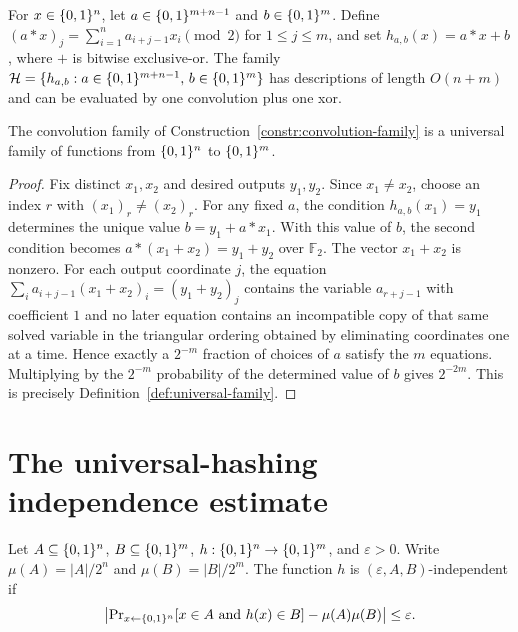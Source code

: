 \begin{construction}
  \label{constr:convolution-family}
  For $x \in \{0,1\}^n$, let $a \in \{0,1\}^{m+n-1}$ and $b \in \{0,1\}^m$. Define
  $(a*x)_j=\sum_{i=1}^{n} a_{i+j-1}x_i \pmod 2$ for $1 \le j \le m$, and set
  $h_{a,b}(x)=a*x+b$, where $+$ is bitwise exclusive-or. The family
  $\mathcal{H}=\{h_{a,b}:a \in \{0,1\}^{m+n-1},\, b \in \{0,1\}^m\}$ has descriptions of
  length $O(n+m)$ and can be evaluated by one convolution plus one xor.
\end{construction}

\begin{lemma}
  \label{lem:convolution-universal}
  The convolution family of Construction~\ref{constr:convolution-family} is a
  universal family of functions from $\{0,1\}^n$ to $\{0,1\}^m$.
\end{lemma}
\begin{proof}
  Fix distinct $x_1,x_2$ and desired outputs $y_1,y_2$. Since $x_1 \ne x_2$,
  choose an index $r$ with $(x_1)_r \ne (x_2)_r$. For any fixed $a$, the
  condition $h_{a,b}(x_1)=y_1$ determines the unique value $b=y_1+a*x_1$.
  With this value of $b$, the second condition becomes
  $a*(x_1+x_2)=y_1+y_2$ over $\mathbb F_2$. The vector $x_1+x_2$ is nonzero.
  For each output coordinate $j$, the equation
  $\sum_i a_{i+j-1}(x_1+x_2)_i=(y_1+y_2)_j$ contains the variable
  $a_{r+j-1}$ with coefficient $1$ and no later equation contains an
  incompatible copy of that same solved variable in the triangular ordering
  obtained by eliminating coordinates one at a time. Hence exactly a
  $2^{-m}$ fraction of choices of $a$ satisfy the $m$ equations. Multiplying
  by the $2^{-m}$ probability of the determined value of $b$ gives
  $2^{-2m}$. This is precisely Definition~\ref{def:universal-family}.
\end{proof}

\chapter{The universal-hashing independence estimate}

\begin{definition}
  \label{def:hash-independence}
  Let $A \subseteq \{0,1\}^n$, $B \subseteq \{0,1\}^m$, $h:\{0,1\}^n \to \{0,1\}^m$,
  and $\varepsilon>0$. Write $\mu(A)=|A|/2^n$ and $\mu(B)=|B|/2^m$.
  The function $h$ is $(\varepsilon,A,B)$-independent if
  \[
    \left|\operatorname{Pr}_{x \leftarrow \{0,1\}^n}[x \in A \text{ and } h(x)\in B]
      -\mu(A)\mu(B)\right|\le \varepsilon .
  \]
\end{definition}

